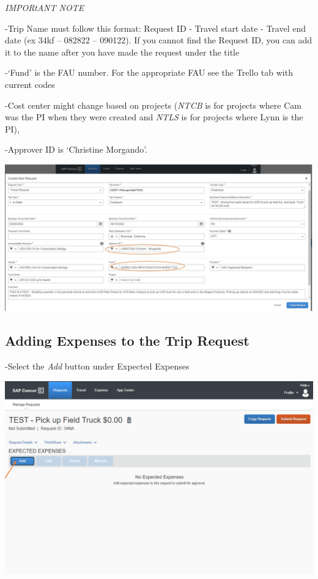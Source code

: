 \documentclass[
]{book}
\begin{document}
\emph{IMPORtANT NOTE}

-Trip Name must follow this format: Request ID - Travel start date - Travel end date (ex 34kf -- 082822 -- 090122). If you cannot find the Request ID, you can add it to the name after you have made the request under the title

-`Fund' is the FAU number. For the appropriate FAU see the Trello tab with current codes

-Cost center might change based on projects (\emph{NTCB} is for projects where Cam was the PI when they were created and \emph{NTLS} is for projects where Lynn is the PI),

-Approver ID is `Christine Morgando'.

\begin{flushleft}\includegraphics[width=0.75\linewidth]{images/concur2a} \end{flushleft}

\hypertarget{adding-expenses-to-the-trip-request}{%
\subsection{Adding Expenses to the Trip Request}\label{adding-expenses-to-the-trip-request}}

-Select the \emph{Add} button under Expected Expenses

\begin{flushleft}\includegraphics[width=0.75\linewidth]{images/concur3} \end{flushleft}
\end{document}
